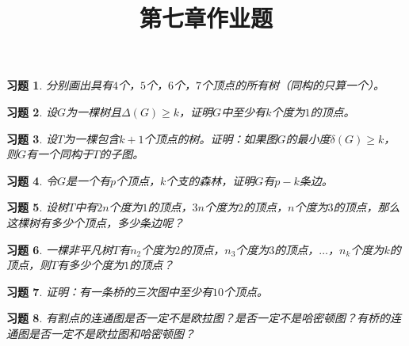 \documentclass{article}
\begin{document}
\title{第七章作业题}
\begin{CJK}{UTF8}{gbsn}
  \newtheorem{Exercise}{习题}
  \date{}
  \maketitle
  \begin{Exercise}
    分别画出具有$4$个，$5$个，$6$个，$7$个顶点的所有树（同构的只算一个）。
  \end{Exercise}
  \clearpage
  \begin{Exercise}
    设$G$为一棵树且$\Delta (G) \geq k$，证明$G$中至少有$k$个度为$1$的顶点。
  \end{Exercise}
  \vspace{5cm}
  \begin{Exercise}
    设$T$为一棵包含$k+1$个顶点的树。证明：如果图$G$的最小度$\delta(G)\geq k$，则$G$有一个同构于$T$的子图。
  \end{Exercise}
  \vspace{5cm}
  \begin{Exercise}
  令$G$是一个有$p$个顶点，$k$个支的森林，证明$G$有$p-k$条边。
  \end{Exercise}
 \vspace{5cm}
  \begin{Exercise}
    设树$T$中有$2n$个度为$1$的顶点，$3n$个度为$2$的顶点，$n$个度为$3$的顶点，那么这棵树有多少个顶点，多少条边呢？
  \end{Exercise}
\vspace{5cm}
  \begin{Exercise}
    一棵非平凡树$T$有$n_2$个度为$2$的顶点，$n_3$个度为$3$的顶点，$\ldots$，$n_k$个度为$k$的顶点，则$T$有多少个度为$1$的顶点？
  \end{Exercise}
\vspace{5cm}
  

  \begin{Exercise}
    证明：有一条桥的三次图中至少有$10$个顶点。
  \end{Exercise}
\vspace{5cm}
  \begin{Exercise}
    有割点的连通图是否一定不是欧拉图？是否一定不是哈密顿图？有桥的连通图是否一定不是欧拉图和哈密顿图？
  \end{Exercise}

\end{CJK}
\end{document}
